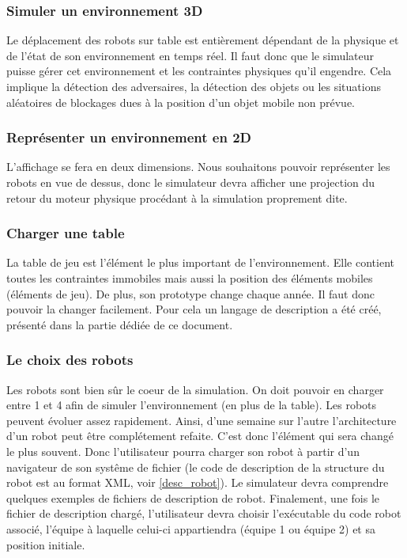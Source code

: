 \subsubsection{Simuler un environnement 3D}
Le déplacement des robots sur table est entièrement dépendant de la physique et de l'état de son environnement en temps réel. Il faut donc que le simulateur puisse gérer cet environnement et les contraintes physiques qu'il engendre. Cela implique la détection des adversaires, la détection des objets ou les situations aléatoires de blockages dues à la position d'un objet mobile non prévue. %

\subsubsection{Représenter un environnement en 2D}
L'affichage se fera en deux dimensions. Nous souhaitons pouvoir représenter les robots en vue de dessus, donc le simulateur devra afficher une projection du retour du moteur physique procédant à la simulation proprement dite. 

\subsubsection{Charger une table}
La table de jeu est l'élément le plus important de l'environnement. Elle contient toutes les contraintes immobiles mais aussi la position des éléments mobiles (éléments de jeu). De plus, son prototype change chaque année. Il faut donc pouvoir la changer facilement. Pour cela un langage de description a été créé, présenté dans la partie dédiée de ce document.

\subsubsection{Le choix des robots}
Les robots sont bien sûr le coeur de la simulation. On doit pouvoir en charger entre 1 et 4 afin de simuler l'environnement (en plus de la table). Les robots peuvent évoluer assez rapidement. Ainsi, d'une semaine sur l'autre l'architecture d'un robot peut être complétement refaite. C'est donc l'élément qui sera changé le plus souvent. Donc l'utilisateur pourra charger son robot à partir d'un navigateur de son systême de fichier (le code de description de la structure du robot est au format XML, voir \ref{desc_robot}). Le simulateur devra comprendre quelques exemples de fichiers de description de robot. Finalement, une fois le fichier de description chargé, l'utilisateur devra choisir l'exécutable du code robot associé, l'équipe à laquelle celui-ci appartiendra (équipe 1 ou équipe 2) et sa position initiale. 

